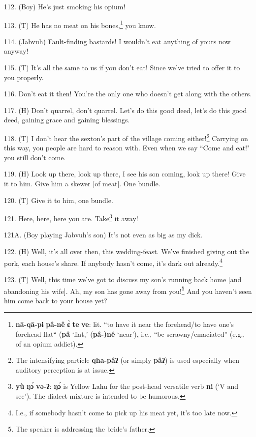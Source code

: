 112. (Boy) He's just smoking his opium!

113. (T) He has no meat on his bones,\footnote{\textbf{nā-qā-pɨ} \textbf{pâ-nê} \textbf{ɛ̀} \textbf{te} \textbf{ve}: lit. ``to have it near the forehead/to have one's forehead flat`` (\textbf{pâ} `flat,' (\textbf{pâ-)nê} `near'), i.e., ``be scrawny/emaciated'' (e.g., of an opium addict).} you know.


114. (Jabvuh) Fault-finding bastards! I wouldn't eat anything of yours now anyway!

115. (T) It's all the same to us if you don't eat! Since we've tried to offer it
to you properly.

116. Don't eat it then! You're the only one who doesn't get along with the others.

117. (H) Don't quarrel, don't quarrel. Let's do this good deed, let's do this good
deed, gaining grace and gaining blessings.

118. (T) I don't hear the sexton's part of the village coming either!\footnote{The intensifying particle \textbf{qha-pâʔ} (or simply \textbf{pâʔ}) is used especially when auditory perception is at issue.} Carrying
on this way, you people are hard to reason with. Even when we say ``Come
and eat!" you still don't come.

119. (H) Look up there, look up there, I see his son coming, look up there! Give
it to him. Give him a skewer [of meat]. One bundle.

120. (T) Give it to him, one bundle.

121. Here, here, here you are. Take\footnote{\textbf{yù} \textbf{ŋɔ́} \textbf{və-ʔ}: \textbf{ŋɔ́} is Yellow Lahu for the post-head versatile verb \textbf{ni} (`V and see'). The dialect mixture is intended to be humorous.} it away!

121A. (Boy playing Jabvuh's son) It's not even as big as my dick. 

122. (H) Well, it's all over then, this wedding-feast. We've finished giving out
the pork, each house's share. If anybody hasn't come, it's dark out already.\footnote{I.e., if somebody hasn't come to pick up his meat yet, it's too late now.}

\begin{center}
\end{center}

123. (T) Well, this time we've got to discuss my son's running back home [and abandoning
his wife]. Ah, my son has gone away from you!\footnote{The speaker is addressing the bride's father.} And you haven't seen him come
back to your house yet?

